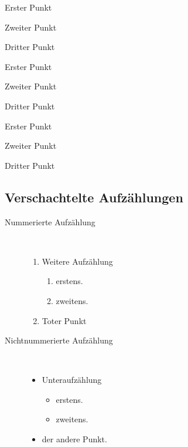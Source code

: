 \documentclass[a4paper,10pt]{scrartcl}
\begin{document}
\begin{compactenum}[(i)]
		\item{Erster Punkt}
		\item{Zweiter Punkt}
		\item{Dritter Punkt}
\end{compactenum}

\begin{compactenum}[(I)]
		\item{Erster Punkt}
		\item{Zweiter Punkt}
		\item{Dritter Punkt}
\end{compactenum}

\begin{compactenum}[a)]
		\item{Erster Punkt}
		\item{Zweiter Punkt}
		\item{Dritter Punkt}
\end{compactenum}

\subsection{Verschachtelte Aufzählungen}

\begin{description}
   \item[Nummerierte Aufzählung]~\par
   \begin{enumerate}
      \item Weitere Aufzählung
      \begin{enumerate}
         \item erstens.
         \item zweitens.
      \end{enumerate}
      \item Toter Punkt
   \end{enumerate}
	
   \item[Nichtnummerierte Aufzählung]~\par
   \begin{itemize}
      \item Unteraufzählung
      \begin{itemize}
         \item erstens.
         \item zweitens.
      \end{itemize}
      \item der andere Punkt.
   \end{itemize}
\end{description}
\end{document}
